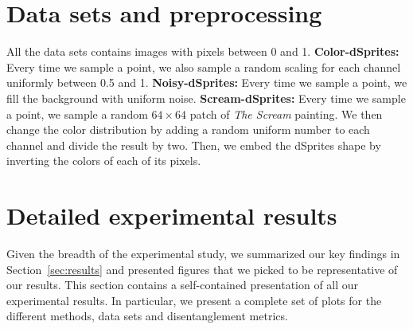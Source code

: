 \section{Data sets and preprocessing}\label{app:datasets}
All the data sets contains images with pixels between \num{0} and \num{1}. 
\textbf{Color-dSprites:} Every time we sample a point, we also sample a random scaling for each channel uniformly between \num{0.5} and \num{1}. 
\textbf{Noisy-dSprites:} Every time we sample a point, we fill the background with uniform noise. 
\textbf{Scream-dSprites:} Every time we sample a point, we sample a random $64\times 64$ patch of \textit{The Scream} painting. We then change the color distribution by adding a random uniform number to each channel and divide the result by two. Then, we embed the dSprites shape by inverting the colors of each of its pixels.


\newpage
\section{Detailed experimental results}\label{app:results}
Given the breadth of the experimental study, we summarized our key findings in Section~\ref{sec:results} and presented figures that we picked to be representative of our results.
This section contains a self-contained presentation of all our experimental results.
In particular, we present a complete set of plots for the different methods, data sets and disentanglement metrics.

